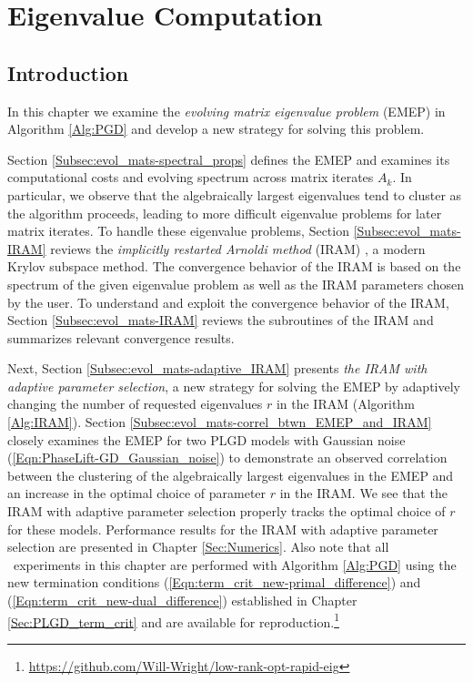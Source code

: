 \chapter{Eigenvalue Computation}		\label{Sec:evol_mats}



\section{Introduction}   \label{Subsec:evol_mats-intro}


In this chapter we examine the \textit{evolving matrix eigenvalue problem} (EMEP) in Algorithm \ref{Alg:PGD} and develop a new strategy for solving this problem.


Section \ref{Subsec:evol_mats-spectral_props} defines the EMEP and examines its computational costs and evolving spectrum across matrix iterates $A_k$.  
In particular, we observe that the algebraically largest eigenvalues tend to cluster as the algorithm proceeds, leading to more difficult eigenvalue problems for later matrix iterates.  
To handle these eigenvalue problems, Section \ref{Subsec:evol_mats-IRAM} reviews the \textit{implicitly restarted Arnoldi method} (IRAM) \cite{sorensen1992implicit}, a modern Krylov subspace method. 
The convergence behavior of the IRAM is based on the spectrum of the given eigenvalue problem as well as the IRAM parameters chosen by the user.
To understand and exploit the convergence behavior of the IRAM, Section \ref{Subsec:evol_mats-IRAM} reviews the subroutines of the IRAM and summarizes relevant convergence results.


Next, Section \ref{Subsec:evol_mats-adaptive_IRAM} presents \textit{the IRAM with adaptive parameter selection}, a new strategy for solving the EMEP by adaptively changing
the number of requested eigenvalues $r$ in the IRAM (Algorithm \ref{Alg:IRAM}).
Section \ref{Subsec:evol_mats-correl_btwn_EMEP_and_IRAM} closely examines the EMEP for two PLGD models with Gaussian noise (\ref{Eqn:PhaseLift-GD_Gaussian_noise}) to demonstrate an observed correlation between the clustering of the algebraically largest eigenvalues in the EMEP and an increase in the optimal choice of parameter $r$ in the IRAM.
We see that the IRAM with adaptive parameter selection properly tracks the optimal choice of $r$ for these models.
Performance results for the IRAM with adaptive parameter selection are presented in  Chapter \ref{Sec:Numerics}.
Also note that all \emep \ experiments in this chapter are performed with Algorithm \ref{Alg:PGD} using the new termination conditions (\ref{Eqn:term_crit_new-primal_difference}) and (\ref{Eqn:term_crit_new-dual_difference}) established in Chapter \ref{Sec:PLGD_term_crit} and are available for reproduction.\footnote{\url{https://github.com/Will-Wright/low-rank-opt-rapid-eig}}




